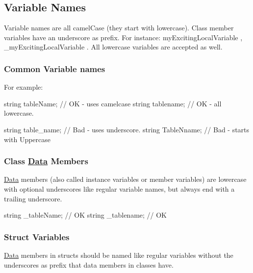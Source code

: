 \subsection*{Variable Names}

Variable names are all camel\+Case (they start with lowercase). Class member variables have an underscore as prefix. For instance\+: {\ttfamily my\+Exciting\+Local\+Variable} , {\ttfamily \+\_\+my\+Exciting\+Local\+Variable} . All lowercase variables are accepted as well.

\subsubsection*{Common Variable names}

For example\+:


\begin{DoxyCode}
\textcolor{keywordtype}{string} tableName;  \textcolor{comment}{// OK - uses camelcase}
\textcolor{keywordtype}{string} tablename;   \textcolor{comment}{// OK - all lowercase.}

\textcolor{keywordtype}{string} table\_name;   \textcolor{comment}{// Bad - uses underscore.}
\textcolor{keywordtype}{string} TableNname;   \textcolor{comment}{// Bad - starts with Uppercase}
\end{DoxyCode}


\subsubsection*{Class \hyperlink{classData}{Data} Members}

\hyperlink{classData}{Data} members (also called instance variables or member variables) are lowercase with optional underscores like regular variable names, but always end with a trailing underscore.


\begin{DoxyCode}
\textcolor{keywordtype}{string} \_tableName;   \textcolor{comment}{// OK}
\textcolor{keywordtype}{string} \_tablename;   \textcolor{comment}{// OK}
\end{DoxyCode}


\subsubsection*{Struct Variables}

\hyperlink{classData}{Data} members in structs should be named like regular variables without the underscores as prefix that data members in classes have.


